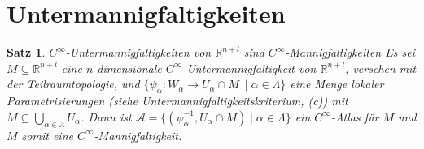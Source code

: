 \documentclass[a4paper,11pt,notitlepage]{report}
\newtheorem{theorem}{Satz}[chapter]
\newcommand{\R}{{\ensuremath{\mathbb{R}}}}
\begin{document}
\section{Untermannigfaltigkeiten}
\begin{theorem}{$C^\infty$-Untermannigfaltigkeiten von $\R^{n+l}$ sind $C^\infty$-Mannigfaltigkeiten}
	Es sei $M \subseteq \R^{n+l}$ eine $n$-dimensionale $C^\infty$-Untermannigfaltigkeit von $\R^{n+l}$, versehen mit der Teilraumtopologie, und $\{\psi_\alpha \colon W_\alpha \rightarrow U_\alpha \cap M\ \mid \alpha \in \Lambda\}$ eine Menge lokaler Parametrisierungen (siehe Untermannigfaltigkeitskriterium, (c)) mit $M \subseteq \bigcup\limits_{\alpha \in \Lambda}{U_\alpha}$.
	\newline
	Dann ist $\mathcal{A}=\{(\psi_\alpha^{-1}, U_\alpha \cap M) \mid \alpha \in \Lambda\}$ ein $C^\infty$-Atlas für $M$ und $M$ somit eine $C^\infty$-Mannigfaltigkeit.
\end{theorem}
\end{document}
